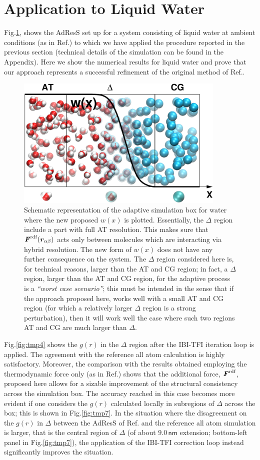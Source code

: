\documentclass[aps,prb,preprint,citeautoscript]{revtex4}
\newcommand{\redc}[1]{{\color{black} #1}}
\renewcommand{\v}[1]{\textbf{\textit{#1}}}
\begin{document}
\section{Application to Liquid Water}\label{sec:water}
Fig.\ref{adapt-wat}, shows the AdResS set up for a system consisting of liquid water at ambient conditions (as in Ref.\cite{prlgc}) to which we have applied the procedure reported in the previous section (technical details of the simulation can be found in the Appendix). Here we show the numerical results for liquid water and prove that our approach represents a successful refinement of the original method of Ref.\cite{prlgc}. 
\begin{figure}
  \centering
  \includegraphics[angle=0,width=10cm]{adapt-wat.eps}
  \caption{Schematic representation of the adaptive simulation box for water where the new proposed $w(x)$ is plotted. Essentially, the $\Delta$ region include a part with full AT resolution. This makes sure that $\v F^{\textrm{rdf}}(\v r_{\alpha\beta})$ acts only between molecules which are interacting via hybrid resolution. The new form of $w(x)$ does not have any further consequence on the system. The $\Delta$ region considered here is, for technical reasons, larger than the AT and CG region; in fact, a $\Delta$ region, larger than the AT and CG region, for the adaptive process is a {\it ``worst case scenario''}; \redc{ this must be intended in the sense that if the approach proposed here, works well with a small AT and CG region (for which a relatively larger $\Delta$ region is a strong perturbation), then it will work well the case where such two regions AT and CG are much larger than $\Delta$.}}
  \label{adapt-wat}
\end{figure}
Fig.\ref{fig:tmp4} shows the $g(r)$ in the $\Delta$ region after the IBI-TFI iteration loop is applied. The agreement with the reference all atom calculation is highly satisfactory. Moreover, the comparison with the results obtained employing the thermodynamic force only (as in Ref.\cite{prlgc}) shows that the additional force, $\v F^{\textrm{rdf}}$, proposed here allows for a sizable improvement of the structural consistency across the simulation box. The accuracy reached in this case becomes more evident if one considers the $g(r)$ calculated locally in subregions of $\Delta$ across the box; this is shown in Fig.\ref{fig:tmp7}. In the situation where the disagreement on the $g(r)$ in $\Delta$ between the AdResS of Ref.\cite{prlgc} and the reference all atom simulation is larger, that is the central region of $\Delta$ (of about $9.0\, \textsf{nm}$ extension; bottom-left panel in Fig.\ref{fig:tmp7}), the application of the  IBI-TFI correction loop instead significantly improves the situation. 
\end{document}
